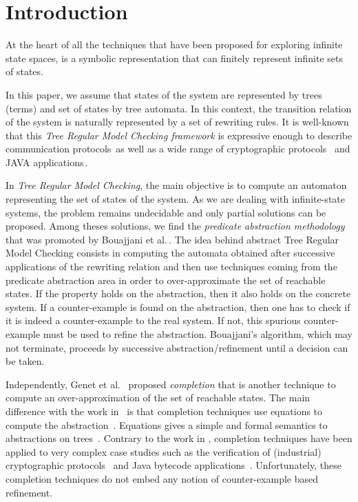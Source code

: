 \section{Introduction}
\label{sec:introduction}

At the heart of all the techniques that have been proposed for
exploring infinite state spaces, is a symbolic representation that can
finitely represent infinite sets of states.

In this paper, we assume that states of the system are represented by
trees (terms) and set of states by tree automata. In this context, the
transition relation of the system is naturally represented by a set of
rewriting rules. It is well-known that this {\em Tree Regular Model
  Checking framework} is expressive enough to describe communication
protocols\,\cite{ALRd05} as well as a wide range of cryptographic
protocols~\cite{GenetK-CADE00,GenetTTVTT-wits03,avispa-site} and JAVA
applications\,\cite{BoichutGJL-RTA07}. 

In {\em Tree Regular Model Checking}, the main objective is to compute
an automaton representing the set of states of the system. As we are
dealing with infinite-state systems, the problem remains undecidable
and only partial solutions can be proposed. Among theses solutions, we
find the {\em predicate abstraction methodology} that was promoted by
Bouajjani et al.\,\cite{BHRV06a,BHRV06b}. The idea behind abstract
Tree Regular Model Checking consists in computing the automata
obtained after successive applications of the rewriting relation and
then use techniques coming from the predicate abstraction area in
order to over-approximate the set of reachable states. If the property
holds on the abstraction, then it also holds on the concrete
system. If a counter-example is found on the abstraction, then one has
to check if it is indeed a counter-example to the real system. If not,
this spurious counter-example must be used to refine the
abstraction. Bouajjani's algorithm, which may not terminate, proceeds
by successive abstraction/refinement until a decision can be taken.

Independently, Genet et
al.~\cite{Genet-RTA98,FeuilladeGVTT-JAR04,GenetR-JSC10} proposed {\em
  completion} that is another technique to compute an
over-approximation of the set of reachable states. The main difference
with the work in~\cite{BHRV06a} is that completion techniques use
equations to compute the abstraction~\cite{GenetR-JSC10}. Equations
gives a simple and formal semantics to abstractions on
trees~\cite{MeseguerPM-TCS08}.  Contrary to the work in
\cite{BHRV06a,BHRV06b}, completion techniques have been applied to
very complex case studies such as the verification of (industrial)
cryptographic
protocols~\cite{GenetK-CADE00,GenetTTVTT-wits03,avispa-site} and Java
bytecode applications~\cite{BoichutGJL-RTA07}. Unfortunately, these
completion techniques do not embed any notion of counter-example based
refinement.

